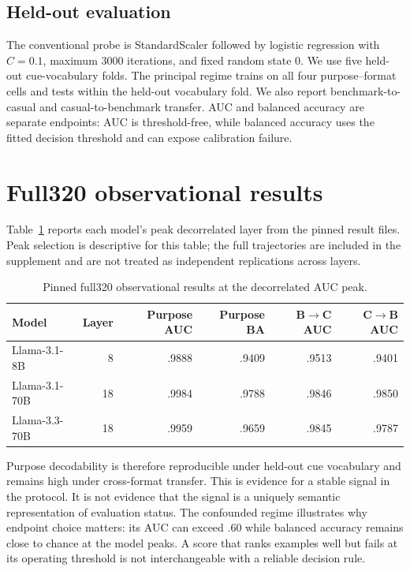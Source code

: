 \documentclass{article}
\begin{document}
\subsection{Held-out evaluation}
The conventional probe is StandardScaler followed by logistic regression with $C=0.1$, maximum 3000 iterations, and fixed random state 0. We use five held-out cue-vocabulary folds. The principal regime trains on all four purpose--format cells and tests within the held-out vocabulary fold. We also report benchmark-to-casual and casual-to-benchmark transfer. AUC and balanced accuracy are separate endpoints: AUC is threshold-free, while balanced accuracy uses the fitted decision threshold and can expose calibration failure.

\section{Full320 observational results}
Table~\ref{tab:peaks} reports each model's peak decorrelated layer from the pinned result files. Peak selection is descriptive for this table; the full trajectories are included in the supplement and are not treated as independent replications across layers.

\begin{table}[t]
\caption{Pinned full320 observational results at the decorrelated AUC peak.}
\label{tab:peaks}
\centering
\begin{tabular}{lrrrrr}
\toprule
Model & Layer & Purpose AUC & Purpose BA & B$\rightarrow$C AUC & C$\rightarrow$B AUC\\
\midrule
Llama-3.1-8B & 8 & .9888 & .9409 & .9513 & .9401\\
Llama-3.1-70B & 18 & .9984 & .9788 & .9846 & .9850\\
Llama-3.3-70B & 18 & .9959 & .9659 & .9845 & .9787\\
\bottomrule
\end{tabular}
\end{table}

Purpose decodability is therefore reproducible under held-out cue vocabulary and remains high under cross-format transfer. This is evidence for a stable signal in the protocol. It is not evidence that the signal is a uniquely semantic representation of evaluation status. The confounded regime illustrates why endpoint choice matters: its AUC can exceed .60 while balanced accuracy remains close to chance at the model peaks. A score that ranks examples well but fails at its operating threshold is not interchangeable with a reliable decision rule.
\end{document}
